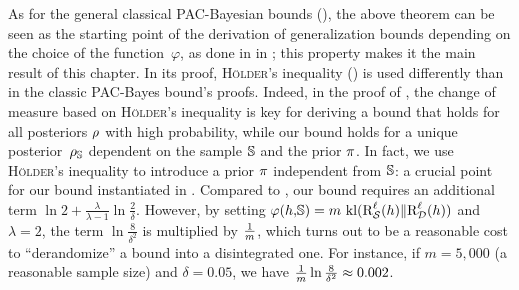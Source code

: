 As for the general classical PAC-Bayesian bounds (), the above theorem can be seen as the starting point of the derivation of generalization bounds depending on the choice of the function~$\varphi$, as done in  in ;
this property makes it the main result of this chapter. 
In its proof, \textsc{Hölder}'s inequality () is used differently than in the classic PAC-Bayes bound's proofs.
Indeed, in the proof of \citet[Th. 8]{BeginGermainLavioletteRoy2016}, the change of measure based on \textsc{Hölder}'s inequality is key for deriving a bound that holds for all posteriors $\Q$ with high probability, while our bound holds for a unique \mbox{posterior $\AQ$} dependent on the sample $\S$ and the prior $\P$.
In fact, we use \textsc{Hölder}'s inequality to introduce a prior $\P$ independent from $\S$: a crucial point for our bound instantiated in .
Compared to , our bound requires an additional term $\ln2{+}\frac{\lambda}{\lambda{-}1}\ln\tfrac{2}{\delta}$.
However, by setting  $\varphi(\h,\!\S)=m\,\kl(\RiskLoss_{\dS}(\h)\|\RiskLoss_{\D}(\h))$ and $\lambda{=}2$, 
the term $\ln\frac{8}{\delta^2}$ is multiplied by $\tfrac{1}{\m}$, which turns out to be a reasonable cost to ``derandomize'' a bound into a disintegrated one.
For instance, if $m=5,000$ (a reasonable sample size) and $\delta=0.05$, we have $\frac{1}{\m}\ln\tfrac{8}{\delta^2}\approx 0.002$.

